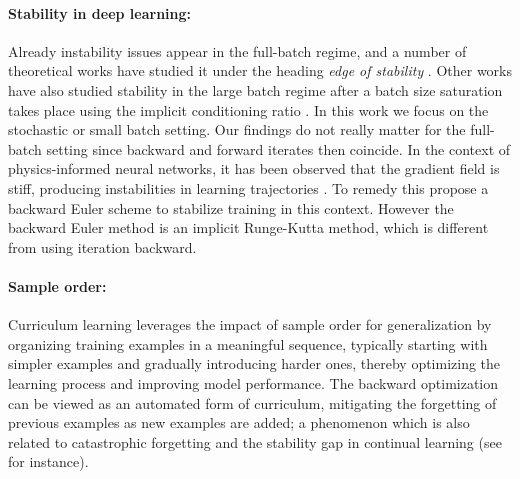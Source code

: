 \paragraph{Stability in deep learning:}
Already instability issues appear in the full-batch regime, and a number of theoretical works have studied it under the heading \emph{edge of stability} \cite{cheng2020stochastic, Wu2024large_stepsize, cai2024large_stepsize}. Other works have also studied stability in the large batch regime after a batch size saturation takes place using the implicit conditioning ratio \cite{lee2022trajectory,Agarwala2024High}. In this work we focus on the stochastic or small batch setting. Our findings do not really matter for the full-batch setting since backward and forward iterates then coincide. In the context of physics-informed neural networks, it has been observed that the gradient field is stiff, producing instabilities in learning trajectories \cite{Wang2020UnderstandingAM}. To remedy this \cite{li2023implicitstochasticgradientdescent} propose a backward Euler scheme to stabilize training in this context. However the backward Euler method is an implicit Runge-Kutta method, which is different from using iteration backward.

\paragraph{Sample order:}
Curriculum learning \cite{soviany2022curriculumlearningsurvey} leverages the impact of sample order for generalization \cite{mange19dataorder} by organizing training examples in a meaningful sequence, typically starting with simpler examples and gradually introducing harder ones, thereby optimizing the learning process and improving model performance. The backward optimization can be viewed as an automated form of curriculum, mitigating the forgetting of previous examples as new examples are added; a phenomenon which is also related to catastrophic forgetting and the stability gap in continual learning (see \cite{lange2023continual} for instance).